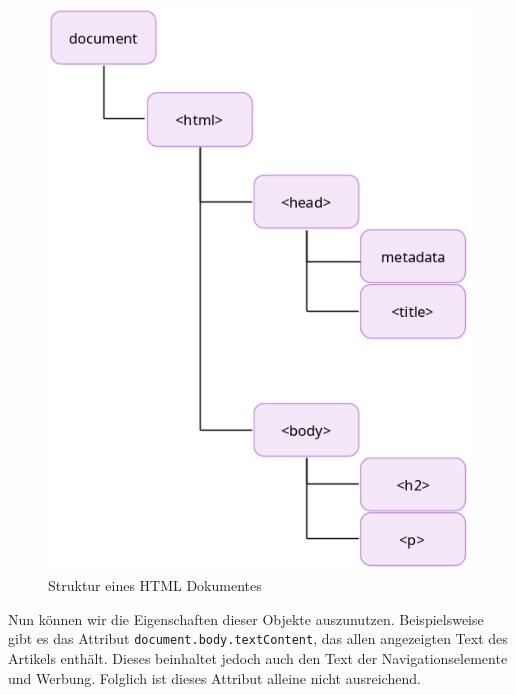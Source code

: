 \begin{figure}
	\centering
	\includegraphics[scale=0.7]{images/html_overview.png}	
	\caption{Struktur eines HTML Dokumentes}
	\label{extractor:image:html}
\end{figure}

Nun können wir die Eigenschaften dieser Objekte auszunutzen. Beispielsweise gibt es das Attribut \texttt{document.body.textContent}, das allen angezeigten Text des Artikels enthält. Dieses beinhaltet jedoch auch den Text der Navigationselemente und Werbung. Folglich ist dieses Attribut alleine nicht ausreichend.

